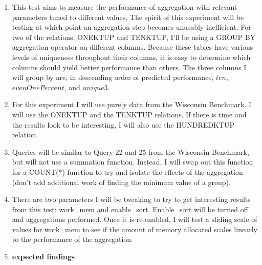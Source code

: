 \documentclass[11pt,letterpaper]{article}
\begin{document}
\begin{enumerate}
\begin{enumerate}
\begin{enumerate}
 		\item This test aims to measure the performance of aggregation with relevant parameters tuned to different values.  The spirit of this experiment will be testing at which point an aggregation step becomes unusably inefficient.  For two of the relations, ONEKTUP and TENKTUP, I'll be using a GROUP BY aggregation operator on different columns. Because these tables have various levels of uniqueness throughout their columns, it is easy to determine which columns should yield better performance than others.  The three columns I will group by are, in descending order of predicted performance, $ten$, $evenOnePercent$, and $unique3$. 
 		\item For this experiment I will use purely data from the Wisconsin Benchmark.  I will use the ONEKTUP and the TENKTUP relations.  If there is time and the results look to be interesting, I will also use the HUNDREDKTUP relation.
 		\item Queries will be similar to Query 22 and 25 from the Wisconsin Benchmark, but will not use a summation function.  Instead, I will swap out this function for a COUNT(*) function to try and isolate the effects of the aggregation (don't add additional work of finding the minimum value of a group).
 		\item There are two parameters I will be tweaking to try to get interesting results from this test: work\_mem and enable\_sort.  Enable\_sort will be turned off and aggregations performed.  Once it is re-enabled, I will test a sliding scale of values for work\_mem to see if the amount of memory allocated scales linearly to the performance of the aggregation.
 		\item \textbf{expected findings}
 		
 	\end{enumerate}


\end{enumerate}
\end{enumerate}
\end{document}
